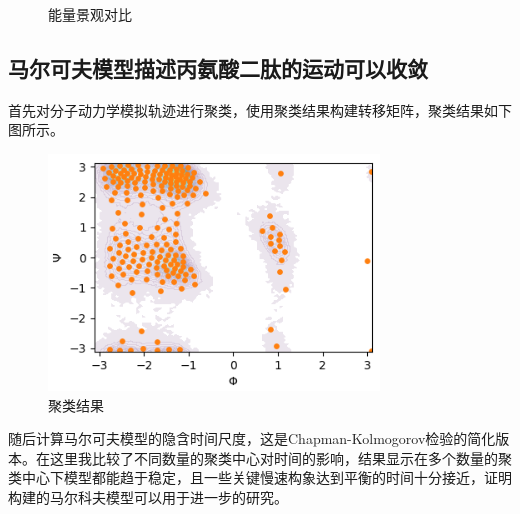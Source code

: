 \documentclass[a4paper]{article}
\begin{document}
\begin{CJK}{UTF8}{gbsn}
\begin{sloppypar}
\begin{figure}[H]
\centering  
{}
\caption{能量景观对比}
\label{Fig.main}
\end{figure}




	

	\subsection{马尔可夫模型描述丙氨酸二肽的运动可以收敛}

	首先对分子动力学模拟轨迹进行聚类，使用聚类结果构建转移矩阵，聚类结果如下图所示。
\begin{figure}[H]
\centering
\includegraphics[scale=0.75]{clus.png}
\caption{聚类结果}
\end{figure}

	随后计算马尔可夫模型的隐含时间尺度，这是Chapman-Kolmogorov检验的简化版本。在这里我比较了不同数量的聚类中心对时间的影响，结果显示在多个数量的聚类中心下模型都能趋于稳定，且一些关键慢速构象达到平衡的时间十分接近，证明构建的马尔科夫模型可以用于进一步的研究。



\end{sloppypar}
\end{CJK}
\end{document}
